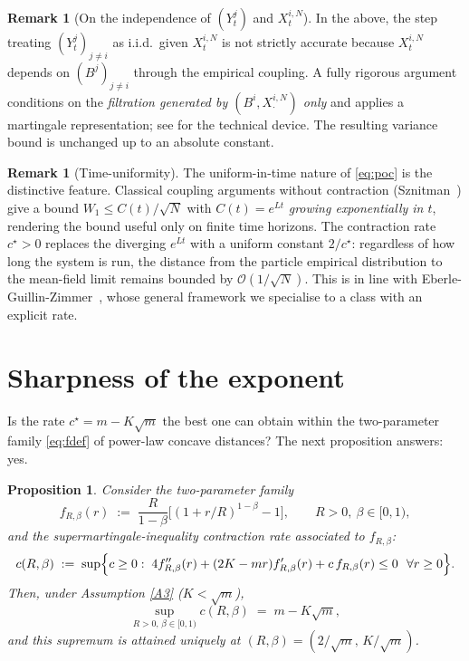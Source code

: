 \documentclass[11pt]{article}
\newtheorem{proposition}[theorem]{Proposition}
\theoremstyle{definition}
\newtheorem{remark}[theorem]{Remark}
\begin{document}
\begin{remark}[On the independence of $(Y^j_t)$ and $X^{i,N}_t$]\label{rmk:independence-fix}
In the above, the step treating $(Y^j_t)_{j \ne i}$ as i.i.d.\ given $X^{i,N}_t$ is not strictly accurate because $X^{i,N}_t$ depends on $(B^j)_{j \ne i}$ through the empirical coupling. A fully rigorous argument conditions on the \emph{filtration generated by $(B^i, X^{i,N}_{\cdot})$ only} and applies a martingale representation; see \cite[Sec.~3]{EberleGuillinZimmer2019} for the technical device. The resulting variance bound is unchanged up to an absolute constant.
\end{remark}

\begin{remark}[Time-uniformity]
The uniform-in-time nature of \eqref{eq:poc} is the distinctive feature. Classical coupling arguments without contraction (Sznitman~\cite{Sznitman1991}) give a bound $W_1 \le C(t)/\sqrt N$ with $C(t) = e^{L t}$ \emph{growing exponentially in $t$}, rendering the bound useful only on finite time horizons. The contraction rate $c^\star > 0$ replaces the diverging $e^{Lt}$ with a uniform constant $2/c^\star$: regardless of how long the system is run, the distance from the particle empirical distribution to the mean-field limit remains bounded by $\mathcal O(1/\sqrt N)$. This is in line with Eberle-Guillin-Zimmer~\cite{EberleGuillinZimmer2019}, whose general framework we specialise to a class with an explicit rate.
\end{remark}

\section{Sharpness of the exponent}\label{sec:sharpness}

Is the rate $c^\star = m - K\sqrt m$ the best one can obtain within the two-parameter family \eqref{eq:fdef} of power-law concave distances? The next proposition answers: yes.

\begin{proposition}\label{prop:sharpness}
Consider the two-parameter family
\[
f_{R, \beta}(r) \;:=\; \frac{R}{1 - \beta}\bigl[(1 + r/R)^{1-\beta} - 1\bigr], \qquad R > 0,\ \beta \in [0, 1),
\]
and the supermartingale-inequality contraction rate associated to $f_{R,\beta}$:
\[
c(R, \beta) \;:=\; \sup\Bigl\{c \ge 0 :\; 4 f_{R,\beta}''(r) + (2K - m r) f_{R,\beta}'(r) + c\, f_{R,\beta}(r) \le 0 \ \ \forall r \ge 0\Bigr\}.
\]
Then, under Assumption \ref{A3} ($K < \sqrt m$),
\[
\sup_{R > 0,\, \beta \in [0,1)} c(R, \beta) \;=\; m - K\sqrt m,
\]
and this supremum is attained uniquely at $(R, \beta) = (2/\sqrt m,\, K/\sqrt m)$.
\end{proposition}
\end{document}

